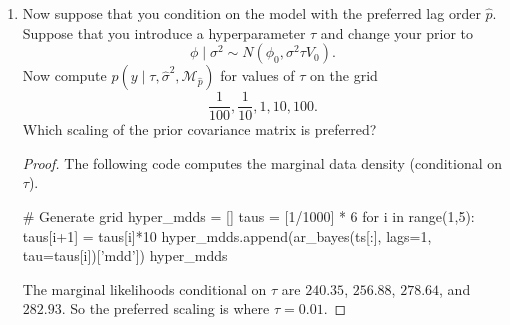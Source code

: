 \documentclass[oneside,reqno]{amsart}
\newcommand{\M}{\mathcal{M}}
\theoremstyle{definition}
\begin{document}
\begin{enumerate}
\begin{proof}
The posterior model probabilities are $0.65$, $0.31$, $0.05$, and $0.002$, for models $\M_1$, $\M_2$, $\M_3$, and $\M_4$, respectively. 
\end{proof}

\item
Now suppose that you condition on the model with the preferred lag
order $\hat p$. Suppose that you introduce a hyperparameter $\tau$ and change your prior to
\begin{equation}
	\phi \mid \sigma^2 \sim N(\phi_0, \sigma^2\tau V_0).
\end{equation}
Now compute $p(y \mid \tau, \hat \sigma^2, \M_{\hat p})$ for values of $\tau$ on the grid 
\[
	\frac{1}{100}, \frac{1}{10}, 1, 10, 100.
\]
Which scaling of the prior covariance matrix is preferred?

\begin{proof}
The following code computes the marginal data density (conditional on $\tau$).
\begin{python3code}
# Generate grid
hyper_mdds = []
taus = [1/1000] * 6
for i in range(1,5):
    taus[i+1] = taus[i]*10
    hyper_mdds.append(ar_bayes(ts[:], lags=1, tau=taus[i])['mdd'])
hyper_mdds
\end{python3code}

The marginal likelihoods conditional on $\tau$ are $240.35$, $256.88$, $278.64$, and $282.93$. So the preferred scaling is where $\tau=0.01$.
\end{proof}
\end{enumerate}
\end{document}
